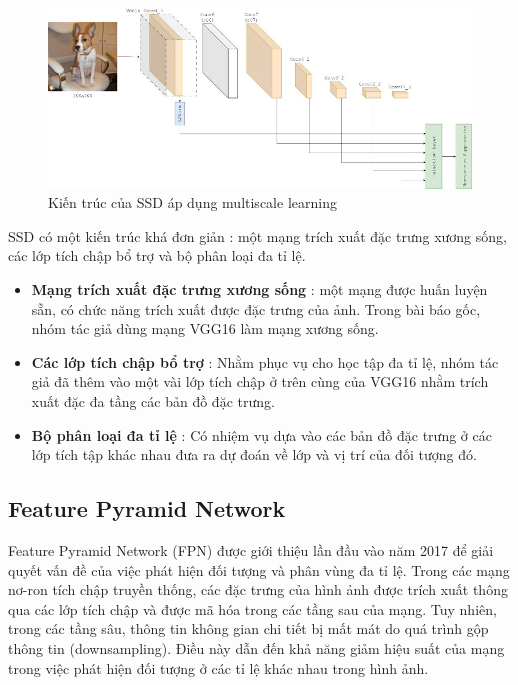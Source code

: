 \documentclass[a4paper]{article}
\begin{document}
\begin{figure}[h]
	\centering
	\includegraphics[width=0.9\linewidth]{fig/z5092846978629_cf95b8626921f76a1384d08ef3dcaa74}
	\caption{Kiến trúc của SSD áp dụng multiscale learning}
	\label{fig:SSD300}
\end{figure}

SSD có một kiến trúc khá đơn giản : một mạng trích xuất đặc trưng xương sống, các lớp tích chập bổ trợ và bộ phân loại đa tỉ lệ.

\begin{itemize}
	\item  \textbf{Mạng trích xuất đặc trưng xương sống} : một mạng được huấn luyện sẵn, có chức năng trích xuất được đặc trưng của ảnh. Trong bài báo gốc, nhóm tác giả dùng mạng VGG16 làm mạng xương sống.
	
	\item \textbf{Các lớp tích chập bổ trợ} : Nhằm phục vụ cho học tập đa tỉ lệ, nhóm tác giả đã thêm vào một vài lớp tích chập ở trên cùng của VGG16 nhằm trích xuất đặc đa tầng các bản đồ đặc trưng.
	
	\item \textbf{Bộ phân loại đa tỉ lệ} : Có nhiệm vụ dựa vào các bản đồ đặc trưng ở các lớp tích tập khác nhau đưa ra dự đoán về lớp và vị trí của đối tượng đó.
\end{itemize}

\subsection{\textbf{Feature Pyramid Network}}

Feature Pyramid Network (FPN) \cite{fpn} được giới thiệu lần đầu vào năm 2017 để giải quyết vấn đề của việc phát hiện đối tượng và phân vùng đa tỉ lệ. Trong các mạng nơ-ron tích chập truyền thống, các đặc trưng của hình ảnh được trích xuất thông qua các lớp tích chập và được mã hóa trong các tầng sau của mạng. Tuy nhiên, trong các tầng sâu, thông tin không gian chi tiết bị mất mát do quá trình gộp thông tin (downsampling). Điều này dẫn đến khả năng giảm hiệu suất của mạng trong việc phát hiện đối tượng ở các tỉ lệ khác nhau trong hình ảnh.
\end{document}
